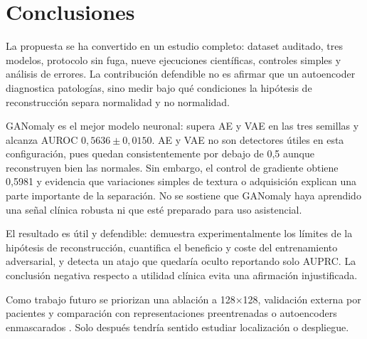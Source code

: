 \section{Conclusiones}

La propuesta se ha convertido en un estudio completo: dataset auditado, tres
modelos, protocolo sin fuga, nueve ejecuciones científicas, controles simples y
análisis de errores. La contribución defendible no es afirmar que un
autoencoder diagnostica patologías, sino medir bajo qué condiciones la hipótesis
de reconstrucción separa normalidad y no normalidad.

GANomaly es el mejor modelo neuronal: supera AE y VAE en las tres semillas y
alcanza AUROC $0{,}5636\pm0{,}0150$. AE y VAE no son detectores útiles en esta
configuración, pues quedan consistentemente por debajo de 0,5 aunque reconstruyen
bien las normales. Sin embargo, el control de gradiente obtiene 0,5981 y
evidencia que variaciones simples de textura o adquisición explican una parte
importante de la separación. No se sostiene que GANomaly haya aprendido una
señal clínica robusta ni que esté preparado para uso asistencial.

El resultado es útil y defendible: demuestra experimentalmente los límites de
la hipótesis de reconstrucción, cuantifica el beneficio y coste del entrenamiento
adversarial, y detecta un atajo que quedaría oculto reportando solo AUPRC. La
conclusión negativa respecto a utilidad clínica evita una afirmación
injustificada.

Como trabajo futuro se priorizan una ablación a 128$\times$128, validación
externa por pacientes y comparación con representaciones preentrenadas o
autoencoders enmascarados \cite{he2022mae,georgescu2023masked}. Solo después
tendría sentido estudiar localización o despliegue.
